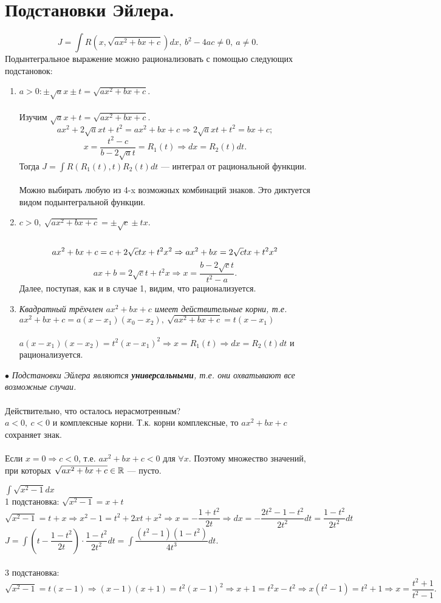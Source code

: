 \section{Подстановки Эйлера.}
$$J=\int R(x, \sqrt{ax^2+bx+c})dx,\ b^2-4ac\neq0,\ a\neq0.$$
Подынтегральное выражение можно рационализовать с помощью следующих подстановок:
\begin{enumerate}
	\item \textit{$a>0:\pm\sqrt{a}x\pm t=\sqrt{ax^2+bx+c}$}.\\\\
	Изучим $\sqrt{a}x+t=\sqrt{ax^2+bx+c}$.
	$$ax^2+2\sqrt{a}xt+t^2=ax^2+bx+c\Rightarrow 2\sqrt{a}xt+t^2=bx+c;$$
	$$x=\frac{t^2-c}{b-2\sqrt{a}t}=R_1(t)\Rightarrow dx=R_2(t)dt.$$
	Тогда $J=\int R(R_1(t),t)R_2(t)dt$ --- интеграл от рациональной функции.\\\\
	Можно выбирать любую из 4-x возможных комбинаций знаков. Это диктуется видом подынтегральной функции.
	\item \textit{$c>0,\ \sqrt{ax^2+bx+c}=\pm\sqrt{c}\pm tx$}.\\\\
	$$ax^2+bx+c=c+2\sqrt{c}tx+t^2x^2\Rightarrow ax^2+bx=2\sqrt{c}tx+t^2x^2$$
	$$ax+b=2\sqrt{c}t+t^2x\Rightarrow x=\frac{b-2\sqrt{c}t}{t^2-a}.$$
	Далее, поступая, как и в случае 1, видим, что рационализуется.
	\item \textit{Квадратный трёхчлен $ax^2+bx+c$ имеет действительные корни, т.е. $ax^2+bx+c=a(x-x_1)(x_0-x_2),\ \sqrt{ax^2+bx+c}=t(x-x_1)$}\\\\
	$a(x-x_1)(x-x_2)=t^2(x-x_1)^2\Rightarrow x=R_1(t)\Rightarrow dx=R_2(t)dt$ и рационализуется.
\end{enumerate}
$\bullet$ \textit{Подстановки Эйлера являются \textbf{универсальными}, т.е. они охватывают все возможные случаи.}\\\\
Действительно, что осталось нерасмотренным?\\
$a<0,\ c<0$ и комплексные корни. Т.к. корни комплексные, то $ax^2+bx+c$ сохраняет знак.\\\\
Если $x=0\Rightarrow c<0$, т.е. $ax^2+bx+c<0$ для $\forall x$. Поэтому множество значений, при которых
$\sqrt{ax^2+bx+c}\in\mathbb{R}$ --- пусто.\\
\begin{example} $\int\sqrt{x^2-1}dx$\\
	1 подстановка: $\sqrt{x^2-1}=x+t$\\
	$\sqrt{x^2-1}=t+x\Rightarrow x^2-1=t^2+2xt+x^2\Rightarrow x=-\dfrac{1+t^2}{2t}\Rightarrow dx=-\dfrac{2t^2-1-t^2}{2t^2}dt=\dfrac{1-t^2}{2t^2}dt$\\
	$J=\int(t-\dfrac{1-t^2}{2t})\cdot\dfrac{1-t^2}{2t^2}dt=\int\dfrac{(t^2-1)(1-t^2)}{4t^3}dt.$\\\\
	3 подстановка: $\sqrt{x^2-1}=t(x-1)\Rightarrow(x-1)(x+1)=t^2(x-1)^2\Rightarrow x+1=t^2x-t^2\Rightarrow x(t^2-1)=t^2+1\Rightarrow x= \dfrac{t^2+1}{t^2-1}.$
\end{example}\\
